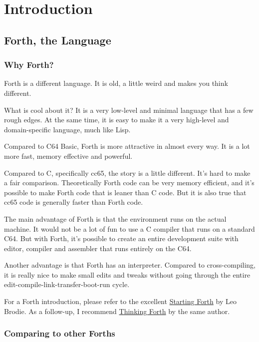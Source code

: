 \chapter{Introduction}

\section{Forth, the Language}

\subsection{Why Forth?}

Forth is a different language. It is old, a little weird and makes you think different.

What is cool about it? It is a very low-level and minimal language that has a few rough edges. At the same time, it is easy to make it a very high-level and domain-specific language, much like Lisp. 

Compared to C64 Basic, Forth is more attractive in almost every way. It is a lot more fast, memory effective and powerful.

Compared to C, specifically cc65, the story is a little different. It's hard to make a fair comparison. Theoretically Forth code can be very memory efficient, and it's possible to make Forth code that is leaner than C code. But it is also true that cc65 code is generally faster than Forth code.

The main advantage of Forth is that the environment runs on the actual machine. It would not be a
lot of fun to use a C compiler that runs on a standard C64. But with Forth, it's possible to create an entire development suite with editor, compiler and assembler that runs entirely on the C64.

Another advantage is that Forth has an interpreter. Compared to cross-compiling, it is really nice
to make small edits and tweaks without going through the entire edit-compile-link-transfer-boot-run cycle.

For a Forth introduction, please refer to the excellent
\href{http://www.forth.com/starting-forth/}{Starting Forth} by Leo Brodie. As a follow-up, I
recommend \href{http://thinking-forth.sourceforge.net/}{Thinking Forth} by the same author.

\subsection{Comparing to other Forths}

